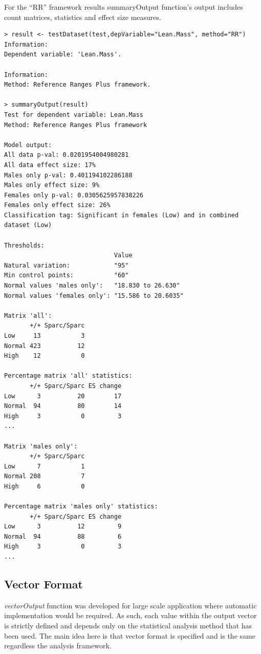 \documentclass[12pt,a4paper]{article}
\begin{document}
For the “RR” framework results summaryOutput function’s output includes count matrices, statistics and effect size measures.
\begingroup
    \fontsize{8pt}{12pt}\selectfont
\begin{verbatim}
> result <- testDataset(test,depVariable="Lean.Mass", method="RR")
Information:
Dependent variable: 'Lean.Mass'.

Information:
Method: Reference Ranges Plus framework.

> summaryOutput(result)
Test for dependent variable: Lean.Mass
Method: Reference Ranges Plus framework

Model output:
All data p-val: 0.0201954004980281
All data effect size: 17%
Males only p-val: 0.401194102286188
Males only effect size: 9%
Females only p-val: 0.0305625957838226
Females only effect size: 26%
Classification tag: Significant in females (Low) and in combined dataset (Low)

Thresholds:
                              Value              
Natural variation:            "95"               
Min control points:           "60"               
Normal values 'males only':   "18.830 to 26.630" 
Normal values 'females only': "15.586 to 20.6035"

Matrix 'all':
       +/+ Sparc/Sparc
Low     13           3
Normal 423          12
High    12           0

Percentage matrix 'all' statistics:
       +/+ Sparc/Sparc ES change
Low      3          20        17
Normal  94          80        14
High     3           0         3
...

Matrix 'males only':
       +/+ Sparc/Sparc
Low      7           1
Normal 208           7
High     6           0

Percentage matrix 'males only' statistics:
       +/+ Sparc/Sparc ES change
Low      3          12         9
Normal  94          88         6
High     3           0         3
...
\end{verbatim}
\endgroup
\subsection{Vector Format}
\textit{vectorOutput} function was developed for large scale application where automatic implementation would be required. 
As such, each value within the output vector is strictly defined and depends only on the statistical analysis method that has been used. 
The main idea here is that vector format is specified and is the same regardless the analysis framework.
\end{document}
